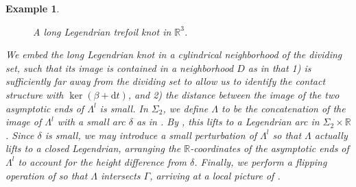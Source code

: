 \documentclass[11pt]{amsart}
\theoremstyle{mystyle}
\newtheorem{example}[example]{Example}
\newcommand{\R}{\mathbb{R}}
\newcommand{\de}{\text{d}}
\newcommand{\<}{\langle}
\renewcommand{\>}{\rangle}
\begin{document}
\begin{example}
\begin{figure}[h]
\begin{minipage}{0.48\textwidth}

        \caption{A long Legendrian trefoil knot in $\R^3$.}
        \label{fig:legendrian trefoil 2}
        \end{minipage}
    \end{figure}

   
    We embed the long Legendrian knot in a cylindrical neighborhood of the dividing set, such that its image is contained in a neighborhood $D$ as in  that 1) is sufficiently far away from the dividing set to allow us to identify the contact structure with $\ker(\beta+\de t)$, and 2) the distance between the image of the two asymptotic ends of $\Lambda^l$ is small. In $\Sigma_2$, we define $\Lambda$ to be the concatenation of the image of $\Lambda^l$ with a small arc $\delta$ as in . By , this lifts to a Legendrian arc in $\Sigma_2\times \R$. Since $\delta$ is small, we may introduce a small perturbation of $\Lambda^l$ so that $\Lambda$ actually lifts to a \textit{closed} Legendrian, arranging the $\R$-coordinates of the asymptotic ends of $\Lambda^l$ to account for the height difference from $\delta$. Finally, we perform a flipping operation of  so that $\Lambda$ intersects $\Gamma$, arriving at a local picture of .

    \begin{figure}[h]
    \begin{minipage}{0.48\textwidth}
        \centering
\begin{tikzpicture}[x=0.65pt,y=0.65pt,yscale=-1,xscale=1]


\end{tikzpicture}
\end{minipage}
\end{figure}
\end{example}
\end{document}

